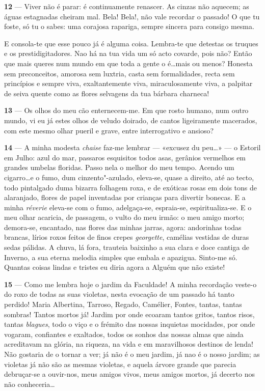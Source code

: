 \textbf{12} — Viver não é parar: é continuamente renascer.
As cinzas não aquecem; as águas estagnadas cheiram
mal. Bela! Bela!, não vale recordar o passado! O que
tu foste, só tu o sabes: uma corajosa rapariga, sempre
sincera para consigo mesma.

E consola-te que esse pouco já é alguma coisa. 
Lembra-te que detestas os truques e os prestidigitadores.
Nao há na tua vida um só acto covarde, pois não?
Então que mais queres num mundo em que toda a
gente o é\ldots mais ou menos? Honesta sem 
preconceitos, amorosa sem luxtria, casta sem formalidades,
recta sem princípios e sempre viva, exaltantemente
viva, miraculosamente viva, a palpitar de seiva
quente como as flores selvagens da tua bárbara
charneca!

\pagebreak 



\textbf{13} — Os olhos do meu cão enternecem-me. Em que
rosto humano, num outro mundo, vi eu já estes olhos
de veludo doirado, de cantos ligeiramente macerados,
com este mesmo olhar pueril e grave, entre 
interrogativo e ansioso?

\textbf{14} — A minha modesta \textit{chaise} faz-me lembrar — 
«excusez du peu\ldots» — o Estoril em Julho: azul do mar,
passaros esquisitos todos asas, gerânios vermelhos em
grandes umbelas floridas. Passo nela o melhor do meu
tempo. Acendo um cigarro\ldots e o fumo, dum cinzento"-azulado,
eleva-se, quase a direito, até ao tecto, todo
pintalgado duma bizarra folhagem roxa, e de exóticas
rosas em dois tons de alaranjado, flores de papel 
inventadas por crianças para divertir bonecas. E a minha
\textit{réverie} eleva-se com o fumo, adelgaça-se, espraia-se,
espiritualiza-se. E o meu olhar acaricia, de passagem,
o vulto do meu irmão: o meu amigo morto; demora-se,
encantado, nas flores das minhas jarras, agora: andorinhas
todas brancas, lírios roxos feitos de finos crepes
 \textit{georgette}, camélias vestidas de duras sedas
pálidas. A chuva, lá fora, trauteia baixinho a sua clara
e doce cantiga de Inverno, a sua eterna melodia simples
que embala e apazigua. Sinto-me só. Quantas coisas
lindas e tristes eu diria agora a Alguém que não
existe!

\pagebreak


\textbf{15} — Como me lembra hoje o jardim da Faculdade!
A minha recordação veste-o do roxo de todas as suas
violetas, nesta evocação de um passado há tanto 
perdido! Maria Albertina, Tarroso, Regado, Camélier,
Fontes, tantas, tantas sombras! Tantos mortos já! 
Jardim por onde ecoaram tantos gritos, tantos risos, tantas
\textit{blagues}, todo o viço e o frémito das nossas inquietas
mocidades, por onde vogaram, confiantes e exaltados,
todos os sonhos das nossas almas que ainda 
acreditavam na glória, na riqueza, na vida e em maravilhosos
destinos de lenda! Não gostaria de o tornar a ver; já
não é o meu jardim, já nao é o nosso jardim; as 
violetas já não são as mesmas violetas, e aquela árvore
grande que parecia debruçar-se a ouvir-nos, meus 
amigos vivos, meus amigos mortos, já decerto nos não
conheceria\ldots

